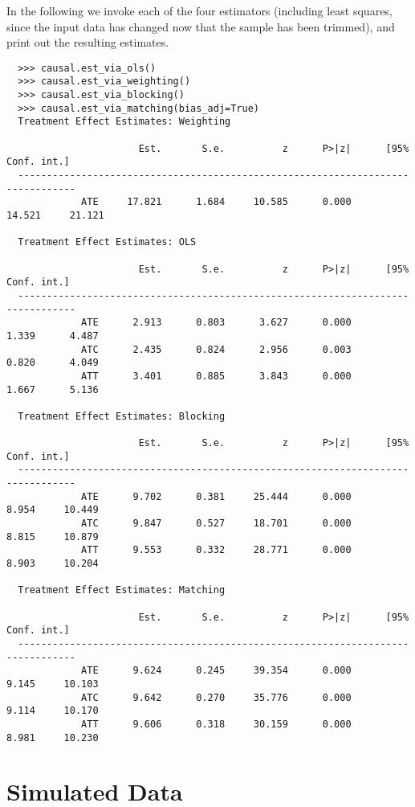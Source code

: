 \documentclass[12pt]{article}
\theoremstyle{definition}
\theoremstyle{definition}
\theoremstyle{definition}
\theoremstyle{remark}
\begin{document}
In the following we invoke each of the four estimators (including least squares, since the input data has changed now that the sample has been trimmed), and print out the resulting estimates.
\begin{verbatim}
  >>> causal.est_via_ols()
  >>> causal.est_via_weighting()
  >>> causal.est_via_blocking()
  >>> causal.est_via_matching(bias_adj=True)
  Treatment Effect Estimates: Weighting
  
                       Est.       S.e.          z      P>|z|      [95% Conf. int.]
  --------------------------------------------------------------------------------
             ATE     17.821      1.684     10.585      0.000     14.521     21.121
  
  Treatment Effect Estimates: OLS
  
                       Est.       S.e.          z      P>|z|      [95% Conf. int.]
  --------------------------------------------------------------------------------
             ATE      2.913      0.803      3.627      0.000      1.339      4.487
             ATC      2.435      0.824      2.956      0.003      0.820      4.049
             ATT      3.401      0.885      3.843      0.000      1.667      5.136
  
  Treatment Effect Estimates: Blocking
  
                       Est.       S.e.          z      P>|z|      [95% Conf. int.]
  --------------------------------------------------------------------------------
             ATE      9.702      0.381     25.444      0.000      8.954     10.449
             ATC      9.847      0.527     18.701      0.000      8.815     10.879
             ATT      9.553      0.332     28.771      0.000      8.903     10.204
  
  Treatment Effect Estimates: Matching
  
                       Est.       S.e.          z      P>|z|      [95% Conf. int.]
  --------------------------------------------------------------------------------
             ATE      9.624      0.245     39.354      0.000      9.145     10.103
             ATC      9.642      0.270     35.776      0.000      9.114     10.170
             ATT      9.606      0.318     30.159      0.000      8.981     10.230
\end{verbatim}

\section{Simulated Data} \label{sec.g}
\end{document}
